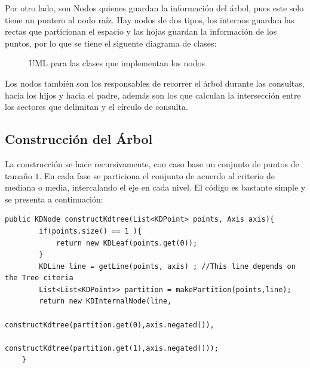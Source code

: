 \documentclass[12pt,letterpaper, margin = 3cm]{article}
\begin{document}
Por otro lado, son Nodos quienes guardan la información del árbol, pues este solo tiene un puntero al nodo raíz. Hay nodos de dos tipos, los internos guardan las rectas que particionan el espacio y las hojas guardan la información de los puntos, por lo que se tiene el siguente diagrama de clases:

\begin{figure}[ht!]
 \centering
{}
 \caption{UML para las clases que implementan los nodos}
\end{figure}
\newpage
Los nodos también son los responsables de recorrer el árbol durante las consultas, hacia los hijos y hacia el padre, además son los que calculan la intersección entre los sectores que delimitan y el círculo de consulta.

\subsection{Construcción del Árbol}

La construcción se hace recursivamente, con caso base un conjunto de puntos de tamaño $1$. En cada fase se particiona el conjunto de acuerdo al criterio de mediana o media, intercalando el eje en cada nivel. El código es bastante simple y se presenta a continuación:
\begin{lstlisting}
public KDNode constructKdtree(List<KDPoint> points, Axis axis){
        if(points.size() == 1 ){
            return new KDLeaf(points.get(0));
        }
        KDLine line = getLine(points, axis) ; //This line depends on the Tree citeria
        List<List<KDPoint>> partition = makePartition(points,line);
        return new KDInternalNode(line,
                                  constructKdtree(partition.get(0),axis.negated()),
                                  constructKdtree(partition.get(1),axis.negated()));
    } 
\end{lstlisting}
\end{document}
